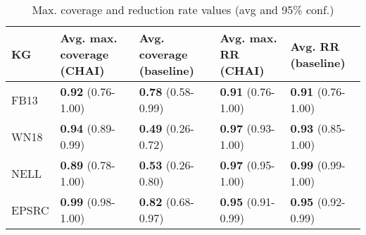 \begin{table}[htp]
    \begin{center}
    \begin{tabular}{ M{1.5cm} | M{2.5cm} | M{2.5cm} | M{2.5cm} | M{2.5cm} } 
    \centering \textbf{KG} & \textbf{Avg. max. coverage (CHAI)} & \textbf{Avg. coverage (baseline)} & \textbf{Avg. max. RR (CHAI)} & \textbf{Avg. RR (baseline)} \\
    \hline
    FB13 & \textbf{0.92} (0.76-1.00) & \textbf{0.78} (0.58-0.99) & \textbf{0.91} (0.76-1.00) & \textbf{0.91} (0.76-1.00) \\ 
    \hline 
    WN18 & \textbf{0.94} (0.89-0.99) & \textbf{0.49} (0.26-0.72) & \textbf{0.97} (0.93-1.00) & \textbf{0.93} (0.85-1.00) \\
    \hline 
    NELL & \textbf{0.89} (0.78-1.00) & \textbf{0.53} (0.26-0.80) & \textbf{0.97} (0.95-1.00) & \textbf{0.99} (0.99-1.00) \\
    \hline 
    EPSRC & \textbf{0.99} (0.98-1.00) & \textbf{0.82} (0.68-0.97) & \textbf{0.95} (0.91-0.99) & \textbf{0.95} (0.92-0.99) \\
    \end{tabular}
    \end{center}
    \caption{Max. coverage and reduction rate values (avg and 95\% conf.)}
    \label{table:recall-rr-max}
\end{table}
